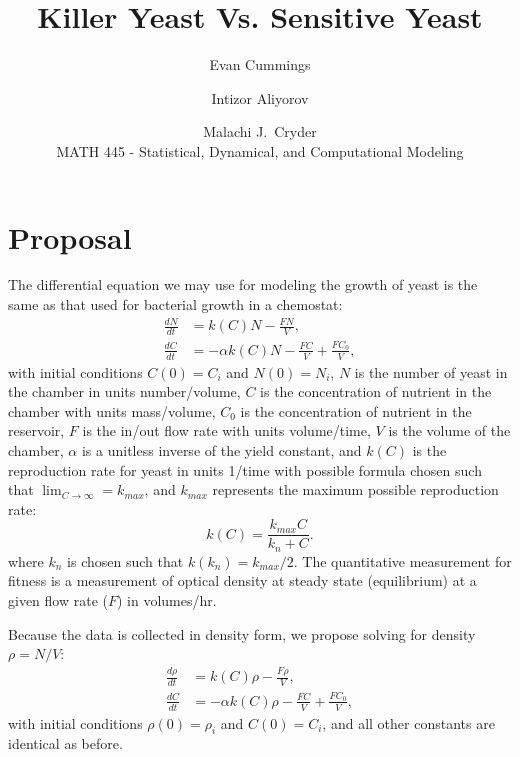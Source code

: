 


\small

\title{Killer Yeast Vs. Sensitive Yeast}
\author{Evan Cummings \and Intizor Aliyorov \and Malachi J.\ Cryder\\
MATH 445 - Statistical, Dynamical, and Computational Modeling}

\maketitle

\section*{Proposal}
The differential equation we may use for modeling the growth of yeast is the same as that used for bacterial growth in a chemostat:
\begin{align*}
  \frac{dN}{dt} &= k(C) N - \frac{FN}{V}, \\
  \frac{dC}{dt} &= -\alpha k(C) N - \frac{FC}{V} + \frac{FC_0}{V},
\end{align*}
with initial conditions $C(0) = C_i$ and $N(0) = N_i$, $N$ is the number of yeast in the chamber in units number/volume, $C$ is the concentration of nutrient in the chamber with units mass/volume, $C_0$ is the concentration of nutrient in the reservoir, $F$ is the in/out flow rate with units volume/time, $V$ is the volume of the chamber, $\alpha$ is a unitless inverse of the yield constant, and $k(C)$ is the reproduction rate for yeast in units 1/time with possible formula chosen such that $\lim_{C \rightarrow \infty} = k_{max}$, and $k_{max}$ represents the maximum possible reproduction rate:
$$k(C) = \frac{k_{max} C}{k_n + C}.$$
where $k_n$ is chosen such that $k(k_n) = k_{max} / 2$.  The quantitative measurement for fitness is a measurement of optical density at steady state (equilibrium) at a given flow rate ($F$) in volumes/hr.

Because the data is collected in density form, we propose solving for density $\rho = N/V$:
\begin{align*}
  \frac{d\rho}{dt} &= k(C) \rho - \frac{F\rho}{V}, \\
  \frac{dC}{dt} &= -\alpha k(C) \rho - \frac{FC}{V} + \frac{FC_0}{V},
\end{align*}
with initial conditions $\rho(0) = \rho_i$ and $C(0) = C_i$, and all other constants are identical as before.

